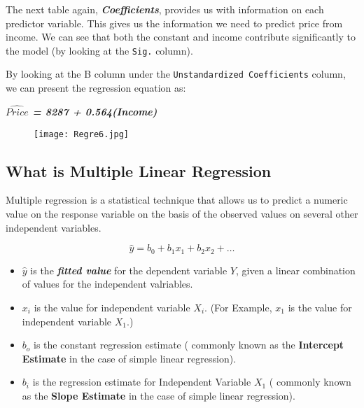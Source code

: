 The next table again, \textbf{\textit{Coefficients}}, provides us with information on each predictor variable. This gives us the information we need to predict price from income. We can see that both the constant and income contribute significantly to the model (by looking at the \texttt{Sig.} column). 

By looking at the B column under the \texttt{Unstandardized Coefficients} column, we can present the regression equation as:
\begin{center}
\textit{\textbf{ $\hat{Price}$ = 8287 + 0.564(Income)}}
\end{center}
\begin{figure}[h!]
\begin{centering}
  \texttt{[image: Regre6.jpg]}\\
\end{centering}
\end{figure}


\newpage

\subsection{What is Multiple Linear Regression}

Multiple regression is a statistical technique that allows us to predict a numeric value on the response variable on the basis of the observed values on several other independent variables.


\[\hat{y} = b_0 + b_1x_1 + b_2x_2 + \ldots \]

\begin{itemize}
	\item $\hat{y}$ is the \textbf{\textit{fitted value}} for the dependent variable \textbf{$Y$}, given a linear combination of values for the independent valriables.
	
	\item $x_i$ is the value for independent variable \textbf{$X_i$}. (For Example, $x_1$ is the value for independent variable \textbf{$X_1$}.)
	\item $b_o$ is the constant regression estimate ( commonly known as the \textbf{Intercept Estimate} in the case of simple linear regression).
	\item $b_i$ is the regression estimate for Independent Variable \textbf{$X_1$} ( commonly known as the \textbf{Slope Estimate} in the case of simple linear regression).
\end{itemize}

